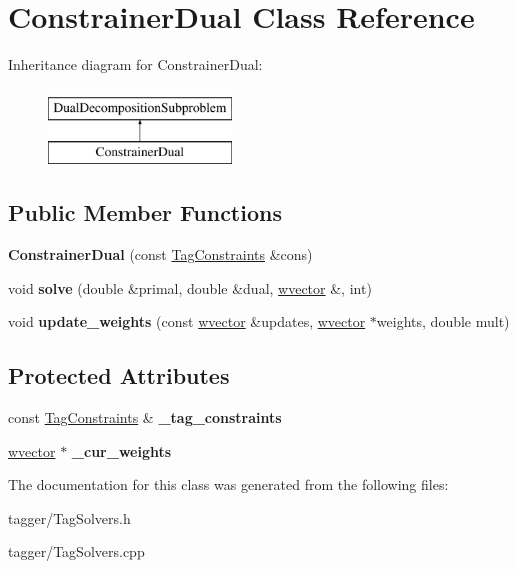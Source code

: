 \hypertarget{classConstrainerDual}{
\section{ConstrainerDual Class Reference}
\label{classConstrainerDual}
}
Inheritance diagram for ConstrainerDual:\begin{figure}[H]
\begin{center}
\leavevmode
\includegraphics[height=2cm]{classConstrainerDual}
\end{center}
\end{figure}
\subsection*{Public Member Functions}
\begin{DoxyCompactItemize}
\item 
\hypertarget{classConstrainerDual_ae74adbb392415eec3451dd5a20820b6b}{
{\bfseries ConstrainerDual} (const \hyperlink{classTagConstraints}{TagConstraints} \&cons)}
\label{classConstrainerDual_ae74adbb392415eec3451dd5a20820b6b}

\item 
\hypertarget{classConstrainerDual_a8cd72c1288fc93a0fec014095ac7252b}{
void {\bfseries solve} (double \&primal, double \&dual, \hyperlink{classsvector}{wvector} \&, int)}
\label{classConstrainerDual_a8cd72c1288fc93a0fec014095ac7252b}

\item 
\hypertarget{classConstrainerDual_a622b99f704a3324133f08521eb4924f5}{
void {\bfseries update\_\-weights} (const \hyperlink{classsvector}{wvector} \&updates, \hyperlink{classsvector}{wvector} $\ast$weights, double mult)}
\label{classConstrainerDual_a622b99f704a3324133f08521eb4924f5}

\end{DoxyCompactItemize}
\subsection*{Protected Attributes}
\begin{DoxyCompactItemize}
\item 
\hypertarget{classConstrainerDual_abda18ff85d425d3748f49709534ec9ea}{
const \hyperlink{classTagConstraints}{TagConstraints} \& {\bfseries \_\-tag\_\-constraints}}
\label{classConstrainerDual_abda18ff85d425d3748f49709534ec9ea}

\item 
\hypertarget{classConstrainerDual_a4dd6e580712c0b35da77e42e137c7274}{
\hyperlink{classsvector}{wvector} $\ast$ {\bfseries \_\-cur\_\-weights}}
\label{classConstrainerDual_a4dd6e580712c0b35da77e42e137c7274}

\end{DoxyCompactItemize}


The documentation for this class was generated from the following files:\begin{DoxyCompactItemize}
\item 
tagger/TagSolvers.h\item 
tagger/TagSolvers.cpp\end{DoxyCompactItemize}
